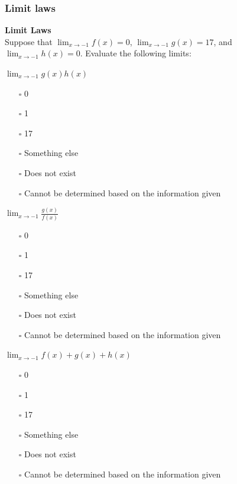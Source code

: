 \documentclass[pdftex, brazil, 12pt, twoside]{article}
\begin{document}
\subsubsection{Limit laws}
\label{u0-lim-quo-limit-laws}

\begin{exercise}
  \textbf{Limit Laws}\\
  Suppose that $\displaystyle \lim_{x \to -1}f(x) = 0$, $\displaystyle \lim_{x \to -1}g(x) = 17$,
  and $\displaystyle \lim_{x \to -1}h(x) = 0$. Evaluate the following limits:

  $\displaystyle \lim_{x \to -1}g(x)h(x)$
  \begin{itemize}[noitemsep]
  \item[$\square$] 0
  \item[$\square$] 1
  \item[$\square$] 17
  \item[$\square$] Something else
  \item[$\square$] Does not exist
  \item[$\square$] Cannot be determined based on the information given
  \end{itemize}

  $\displaystyle \lim_{x \to -1}\frac{g(x)}{f(x)}$
  \begin{itemize}[noitemsep]
  \item[$\square$] 0
  \item[$\square$] 1
  \item[$\square$] 17
  \item[$\square$] Something else
  \item[$\square$] Does not exist
  \item[$\square$] Cannot be determined based on the information given
  \end{itemize}

  $\displaystyle \lim_{x \to -1}f(x) + g(x) + h(x)$
  \begin{itemize}[noitemsep]
  \item[$\square$] 0
  \item[$\square$] 1
  \item[$\square$] 17
  \item[$\square$] Something else
  \item[$\square$] Does not exist
  \item[$\square$] Cannot be determined based on the information given
  \end{itemize}


\end{exercise}
\end{document}
